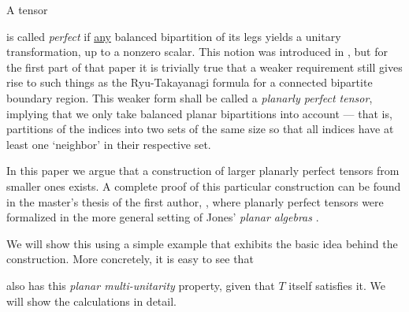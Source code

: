 A tensor 
\begin{center}
\end{center}
is called \emph{perfect} if \underline{any} balanced bipartition of its legs yields a unitary transformation, up to a nonzero scalar. This notion was introduced in \cite{Pastawski2015Holographic}, but for the first part of that paper it is trivially true that a weaker requirement still gives rise to such things as the Ryu-Takayanagi formula for a connected bipartite boundary region. This weaker form shall be called a \emph{planarly perfect tensor}, implying that we only take balanced planar bipartitions into account --- that is, partitions of the indices into two sets of the same size so that all indices have at least one `neighbor' in their respective set. 

In this paper we argue that a construction of larger planarly perfect tensors from smaller ones exists. A complete proof of this particular construction can be found in the master's thesis of the first author, \cite{berger2017PerfectPlanarTangles}, where planarly perfect tensors were formalized in the more general setting of Jones' \emph{planar algebras} \cite{jones1999planar1}.

We will show this using a simple example that exhibits the basic idea behind the construction. More concretely, it is easy to see that
\begin{center}
\end{center}
also has this \emph{planar multi-unitarity} property, given that $T$ itself satisfies it. We will show the calculations in detail.

